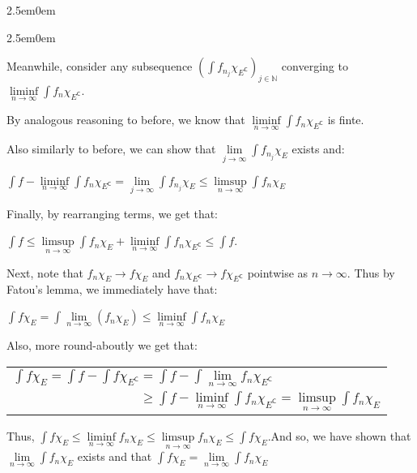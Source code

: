 \documentclass{book}
\newenvironment{myIndent}{%
   \begin{adjustwidth}{2.5em}{0em}%
}{%
   \end{adjustwidth}%
}
\newcommand{\comp}{\mathsf{C}}
\newcommand{\retTwo}{\hfill\bigbreak}
\begin{document}
\begin{myIndent}
\begin{myIndent}
      Meanwhile, consider any subsequence $(\int f_{n_j}\chi_{E^\comp})_{j \in \mathbb{N}}$ converging to $\liminf\limits_{n \rightarrow \infty} \int f_n\chi_{E^\comp}$.\retTwo

      By analogous reasoning to before, we know that $\liminf\limits_{n \rightarrow \infty} \int f_n\chi_{E^\comp}$ is finte.\retTwo
      
      Also similarly to before, we can show that $\lim\limits_{j \rightarrow \infty} \int f_{n_j}\chi_{E}$ exists and:\\ [-8pt]

      {\centering $ \int f - \liminf\limits_{n \rightarrow \infty} \int f_n\chi_{E^\comp} = \lim\limits_{j \rightarrow \infty} \int f_{n_j}\chi_{E} \leq \limsup\limits_{n \rightarrow \infty} \int f_n\chi_{E}$ \retTwo\par}

      Finally, by rearranging terms, we get that:
      
      {\centering $\int f \leq \limsup\limits_{n \rightarrow \infty} \int f_n\chi_{E} + \liminf\limits_{n \rightarrow \infty} \int f_n\chi_{E^\comp} \leq \int f$.\retTwo\par}
   \end{myIndent}

   Next, note that $f_n\chi_E \rightarrow f\chi_E$ and $f_n \chi_{E^\comp} \rightarrow f\chi_{E^\comp}$ pointwise as $n \rightarrow \infty$. Thus by Fatou's lemma, we immediately have that:

   {\centering $\int f\chi_E = \int \lim\limits_{n \rightarrow \infty}(f_n\chi_E) \leq \liminf\limits_{n\rightarrow \infty} \int f_n\chi_E$  \retTwo\par}

   Also, more round-aboutly we get that:

   {\centering
   \begin{tabular}{l}
      $\int f \chi_E = \int f - \int f \chi_{E^\comp} = \int f - \int \lim\limits_{n \rightarrow \infty} f_n\chi_{E^\comp}$\\ [9pt]
      $\phantom{\int f \chi_E = \int f - \int f \chi_{E^\comp}} \geq \int f - \liminf\limits_{n \rightarrow \infty} \int f_n\chi_{E^\comp} = \limsup\limits_{n \rightarrow \infty} \int f_n\chi_E$
   \end{tabular}\retTwo\par}

   Thus, $\int f\chi_E \leq \liminf\limits_{n\rightarrow \infty} f_n\chi_E \leq \limsup\limits_{n\rightarrow \infty} f_n\chi_E \leq \int f\chi_E$.\retTwo And so, we have shown that $\lim\limits_{n \rightarrow \infty} \int f_n\chi_E$ exists and that $\int f\chi_E = \lim\limits_{n \rightarrow \infty} \int f_n\chi_E$
\end{myIndent}
\end{document}
